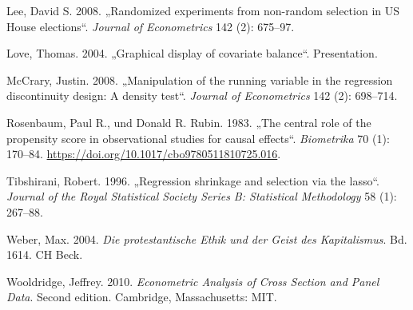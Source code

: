 \documentclass[
  a4paper,
  DIV=11,
  oneside]{scrreprt}
\newlength{\cslhangindent}
\newenvironment{CSLReferences}[2] %
 {\begin{list}{}{%
  \setlength{\itemindent}{0pt}
  \setlength{\leftmargin}{0pt}
  \setlength{\parsep}{0pt}
  \ifodd #1
   \setlength{\leftmargin}{\cslhangindent}
   \setlength{\itemindent}{-1\cslhangindent}
  \fi
  \setlength{\itemsep}{#2\baselineskip}}}
 {\end{list}}
\begin{document}
\begin{CSLReferences}{1}{0}
Lee, David S. 2008. {„Randomized experiments from non-random selection
in US House elections``}. \emph{Journal of Econometrics} 142 (2):
675--97.

Love, Thomas. 2004. {„Graphical display of covariate balance``}.
Presentation.

McCrary, Justin. 2008. {„Manipulation of the running variable in the
regression discontinuity design: A density test``}. \emph{Journal of
Econometrics} 142 (2): 698--714.

Rosenbaum, Paul R., und Donald R. Rubin. 1983. {„The central role of the
propensity score in observational studies for causal effects``}.
\emph{Biometrika} 70 (1): 170--84.
\url{https://doi.org/10.1017/cbo9780511810725.016}.

Tibshirani, Robert. 1996. {„Regression shrinkage and selection via the
lasso``}. \emph{Journal of the Royal Statistical Society Series B:
Statistical Methodology} 58 (1): 267--88.

Weber, Max. 2004. \emph{Die protestantische Ethik und der Geist des
Kapitalismus}. Bd. 1614. CH Beck.

Wooldridge, Jeffrey. 2010. \emph{Econometric Analysis of Cross Section
and Panel Data}. Second edition. Cambridge, Massachusetts: MIT.

\end{CSLReferences}
\end{document}
